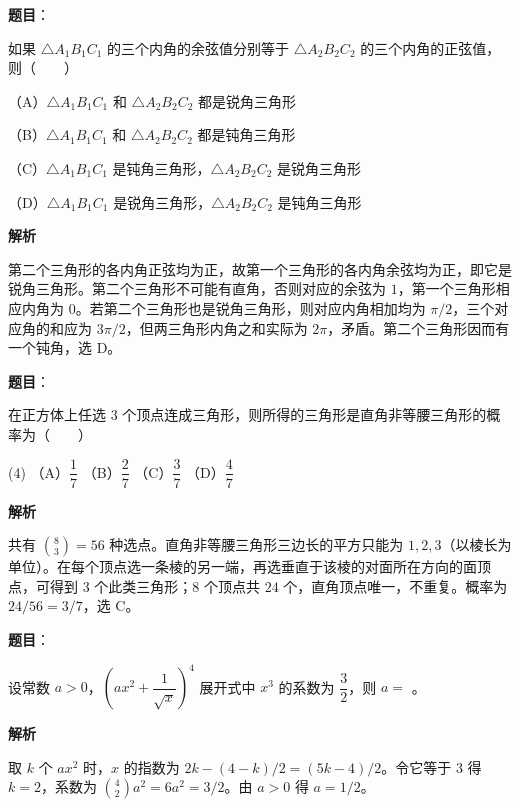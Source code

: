\begin{answer}

\textbf{题目}：

如果 $\triangle A_1B_1C_1$ 的三个内角的余弦值分别等于 $\triangle A_2B_2C_2$ 的三个内角的正弦值，则\mbox{（　　）}

（A）$\triangle A_1B_1C_1$ 和 $\triangle A_2B_2C_2$ 都是锐角三角形

（B）$\triangle A_1B_1C_1$ 和 $\triangle A_2B_2C_2$ 都是钝角三角形

（C）$\triangle A_1B_1C_1$ 是钝角三角形，$\triangle A_2B_2C_2$ 是锐角三角形

（D）$\triangle A_1B_1C_1$ 是锐角三角形，$\triangle A_2B_2C_2$ 是钝角三角形

\textbf{解析}

第二个三角形的各内角正弦均为正，故第一个三角形的各内角余弦均为正，即它是锐角三角形。第二个三角形不可能有直角，否则对应的余弦为 $1$，第一个三角形相应内角为 $0$。若第二个三角形也是锐角三角形，则对应内角相加均为 $\pi/2$，三个对应角的和应为 $3\pi/2$，但两三角形内角之和实际为 $2\pi$，矛盾。第二个三角形因而有一个钝角，选 D。


\end{answer}
\begin{answer}

\textbf{题目}：

在正方体上任选 3 个顶点连成三角形，则所得的三角形是直角非等腰三角形的概率为\mbox{（　　）}

\begin{gkopts}(4)
\task （A）$\dfrac17$
\task （B）$\dfrac27$
\task （C）$\dfrac37$
\task （D）$\dfrac47$
\end{gkopts}

\textbf{解析}

共有 $\binom83=56$ 种选点。直角非等腰三角形三边长的平方只能为 $1,2,3$（以棱长为单位）。在每个顶点选一条棱的另一端，再选垂直于该棱的对面所在方向的面顶点，可得到 3 个此类三角形；8 个顶点共 $24$ 个，直角顶点唯一，不重复。概率为 $24/56=3/7$，选 C。


\end{answer}
\begin{answer}

\textbf{题目}：

设常数 $a>0$，$\left(ax^2+\dfrac1{\sqrt x}\right)^4$ 展开式中 $x^3$ 的系数为 $\dfrac32$，则 $a=$ \gkblank{}。

\textbf{解析}

取 $k$ 个 $ax^2$ 时，$x$ 的指数为 $2k-(4-k)/2=(5k-4)/2$。令它等于 $3$ 得 $k=2$，系数为 $\binom42a^2=6a^2=3/2$。由 $a>0$ 得 $a=1/2$。


\end{answer}
